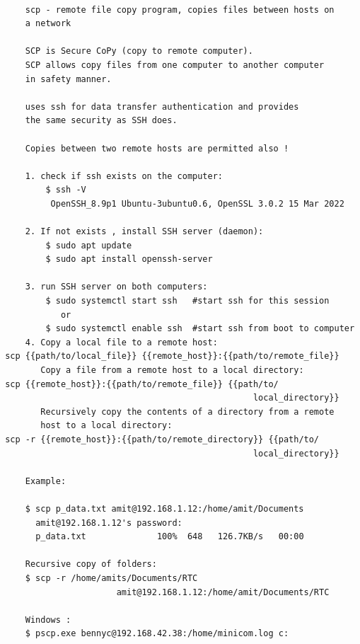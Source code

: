 \documentclass[a4paper,12pt]{article}
\begin{document}
\begin{verbatim}
     
     scp - remote file copy program, copies files between hosts on 
     a network
     
     SCP is Secure CoPy (copy to remote computer).
     SCP allows copy files from one computer to another computer 
     in safety manner.
     
     uses ssh for data transfer authentication and provides
     the same security as SSH does.
     
     Copies between two remote hosts are permitted also !
     
     1. check if ssh exists on the computer:
         $ ssh -V     
          OpenSSH_8.9p1 Ubuntu-3ubuntu0.6, OpenSSL 3.0.2 15 Mar 2022
     
     2. If not exists , install SSH server (daemon): 
         $ sudo apt update        
         $ sudo apt install openssh-server
     
     3. run SSH server on both computers: 
         $ sudo systemctl start ssh   #start ssh for this session 
            or
         $ sudo systemctl enable ssh  #start ssh from boot to computer  
     4. Copy a local file to a remote host: 
 scp {{path/to/local_file}} {{remote_host}}:{{path/to/remote_file}}
        Copy a file from a remote host to a local directory:
 scp {{remote_host}}:{{path/to/remote_file}} {{path/to/
                                                  local_directory}}
        Recursively copy the contents of a directory from a remote 
        host to a local directory:
 scp -r {{remote_host}}:{{path/to/remote_directory}} {{path/to/                        
                                                  local_directory}}                                         

     Example:
     
     $ scp p_data.txt amit@192.168.1.12:/home/amit/Documents
       amit@192.168.1.12's password: 
       p_data.txt              100%  648   126.7KB/s   00:00    
         
     Recursive copy of folders:
     $ scp -r /home/amits/Documents/RTC    
                       amit@192.168.1.12:/home/amit/Documents/RTC
     
     Windows :
     $ pscp.exe bennyc@192.168.42.38:/home/minicom.log c:


     
\end{verbatim}
\end{document}
